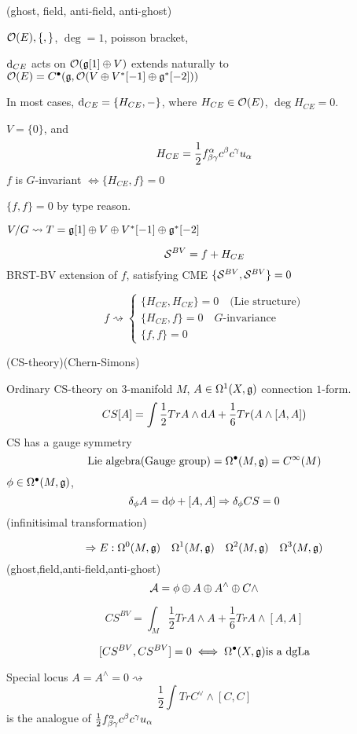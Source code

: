 (ghost, field, anti-field, anti-ghost)

$\mathcal{O}(E),\{,\}$, $\deg=1$, poisson bracket,

$\mathrm{d}_{CE}$ acts on $\mathcal{O}(\mathfrak{g}[1]\oplus V)$
extends naturally to $\mathcal{O}(E)=C^{\bullet}(\mathfrak{g},\mathcal{O}(V\oplus V^*[-1]\oplus \mathfrak{g}^*[-2]))$

In most cases, $\mathrm{d}_{CE}=\{H_{CE},-\}$, where $H_{CE}\in\mathcal{O}(E)$,
$\deg H_{CE}=0$.

\begin{example}
$V=\{0\}$, and 
$$H_{CE}=\frac{1}{2}f^\alpha_{\beta\gamma}c^\beta c^\gamma u_\alpha$$
$f$ is $G$-invariant $\iff \{H_{CE},f\}=0$

$\{f,f\}=0$ by type reason.
\end{example} 

$V/G\rightsquigarrow T=\mathfrak{g}[1]\oplus V\oplus V^*[-1]\oplus \mathfrak{g}^*[-2]$

$$\mathcal{S}^{BV}=f+H_{CE}$$
BRST-BV extension of $f$, satisfying CME $\{\mathcal{S}^{BV},\mathcal{S}^{BV}\}=0$

$$
  f\rightsquigarrow
  \left\{
    \begin{array}{c}
      \{H_{CE},H_{CE}\}=0\quad \text{(Lie structure)}\\
      \{H_{CE},f\}=0 \quad\text{$G$-invariance}\\
      \{f,f\}=0
    \end{array}
  \right.
$$

\begin{example}(CS-theory)(Chern-Simons)

Ordinary CS-theory on $3$-manifold $M$, 
$A\in\Omega^1(X,\mathfrak{g})$ connection $1$-form.
$$CS[A]=\int \frac{1}{2}Tr A\wedge\mathrm{d} A+
\frac{1}{6}Tr(A\wedge[A,A])$$
CS has a gauge symmetry
$$\text{Lie algebra(Gauge group)}=\Omega^{\bullet}(M,\mathfrak{g})=C^\infty(M)$$
$\phi\in\Omega^{\bullet}(M,\mathfrak{g})$, 
$$\delta_\phi A=\mathrm{d}\phi+[A,A]\Rightarrow \delta_\phi CS=0$$
(infinitisimal transformation)
\end{example}

$$\Rightarrow E: \Omega^0(M,\mathfrak{g})\quad
\Omega^1(M,\mathfrak{g})\quad \Omega^2(M,\mathfrak{g})\quad \Omega^3(M,\mathfrak{g})$$
(ghost,field,anti-field,anti-ghost)
$$\mathcal{A}=\phi\oplus A\oplus A^\wedge\oplus C\wedge$$

$$CS^{BV}=\int_M\frac{1}{2}Tr A\wedge A+\frac{1}{6}Tr A\wedge[A,A]$$

$$[CS^{BV},CS^{BV}]=0\iff \Omega^{\bullet}(X,\mathfrak{g}) \text{is a dgLa}$$

Special locus $A=A^\wedge =0\rightsquigarrow$
$$\frac{1}{2}\int Tr C^\vee\wedge [C,C]$$
is the analogue of $\frac{1}{2}f^\alpha_{\beta\gamma}c^\beta c^\gamma u_\alpha$

